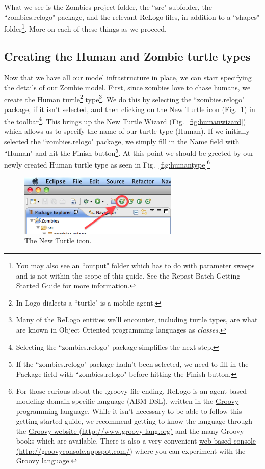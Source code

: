 \documentclass[11pt]{amsart}
\begin{document}
What we see is the Zombies project folder, the ``src" subfolder, the ``zombies.relogo" package, and the relevant ReLogo files, in addition to a ``shapes" folder\footnote{You may also see an ``output" folder which has to do with parameter sweeps and is not within the scope of this guide. See the Repast Batch Getting Started Guide for more information.}. More on each of these things as we proceed.

\subsection{Creating the Human and Zombie turtle types}

Now that we have all our model infrastructure in place, we can start specifying the details of our Zombie model. First, since zombies love to chase humans, we create the Human turtle\footnote{In Logo dialects a ``turtle" is a mobile agent.} type\footnote{Many of the ReLogo entities we'll encounter, including turtle types,  are what are known in Object Oriented programming languages as \emph{classes}.}. We do this by selecting the ``zombies.relogo" package, if it isn't selected, and then clicking on the New Turtle icon (Fig.~\ref{fig:newturtleicon}) in the toolbar\footnote{Selecting the ``zombies.relogo" package simplifies the next step.}. This brings up the New Turtle Wizard (Fig.~\ref{fig:humanwizard}) which allows us to specify the name of our turtle type (Human). If we initially selected the ``zombies.relogo" package, we simply fill in the Name field with ``Human" and hit the Finish button\footnote{If the ``zombies.relogo" package hadn't been selected, we need to fill in the Package field with ``zombies.relogo" before hitting the Finish button.}. At this point we should be greeted by our newly created Human turtle type as seen in Fig.~\ref{fig:humantype}\footnote{For those curious about the .groovy file ending, ReLogo is an agent-based modeling domain specific language (ABM DSL), written in the  \href{http://www.groovy-lang.org}{Groovy} programming language. While it isn't necessary to be able to follow this getting started guide, we recommend getting to know the language through the \href{http://www.groovy-lang.org}{Groovy website (http://www.groovy-lang.org)} and the many Groovy books which are available. There is also a very convenient \href{http://groovyconsole.appspot.com/}{web based console (http://groovyconsole.appspot.com/)} where you can experiment with the Groovy language.}

\begin{figure}
\begin{center}
\vspace{.2in}
\centerline {
\includegraphics[width=3in]{GettingStartedImages/NewTurtle.png}
}
\caption{The New Turtle icon.}
\label{fig:newturtleicon}
\end{center}
\end{figure}
\end{document}
